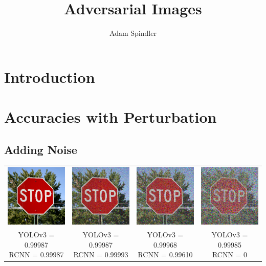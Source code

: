 \documentclass{article}
\title{Adversarial Images}
\author{Adam Spindler}
\begin{document}
\maketitle

\section{Introduction}

\section{Accuracies with Perturbation}

\subsection{Adding Noise}
\begin{center}
\begin{tabular}{ c c c c }
    \includegraphics[width=0.2\linewidth]{../test_images/stop.png} & \includegraphics[width=0.2\linewidth]{../test_images/perturbed/stop_noise_100.png} & \includegraphics[width=0.2\linewidth]{../test_images/perturbed/stop_noise_200.png} & \includegraphics[width=0.2\linewidth]{../test_images/perturbed/stop_noise_500.png} \\
    \makecell{YOLOv3 = 0.99987 \\ RCNN = 0.99987} & \makecell{YOLOv3 = 0.99987 \\ RCNN = 0.99993} & \makecell{YOLOv3 = 0.99968 \\ RCNN = 0.99610} & \makecell{YOLOv3 = 0.99985 \\ RCNN = 0} \\  
\end{tabular}
\end{center}
\end{document}

